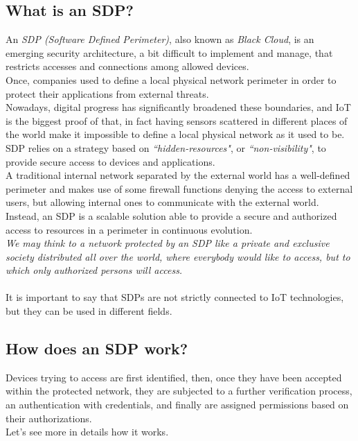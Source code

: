 \documentclass[12pt]{report}
\begin{document}
{{\subsection{What is an SDP?}
\bigskip
An \emph{SDP (Software Defined Perimeter)}, also known as \emph{Black Cloud}, is an emerging security architecture, a bit difficult to implement and manage, that restricts accesses and connections among allowed devices.\\
Once, companies used to define a local physical network perimeter in order to protect their applications from external threats.\\
Nowadays, digital progress has significantly broadened these boundaries, and IoT is the biggest proof of that, in fact having sensors scattered in different places of the world make it impossible to define a local physical network as it used to be.\\

SDP relies on a strategy based on \emph{``hidden-resources"}, or \emph{``non-visibility"}, to provide secure access to devices and applications.\\
A traditional internal network separated by the external world has a well-defined perimeter and makes use of some firewall functions denying the access to external users, but allowing internal ones to communicate with the external world.\\
Instead, an SDP is a scalable solution able to provide a secure and authorized access to resources in a perimeter in continuous evolution.\\

\emph{We may think to a network protected by an SDP like a private and exclusive society distributed all over the world, where everybody would like to access, but to which only authorized persons will access.}~\cite{protectnetwithsdp}\\\\
It is important to say that SDPs are not strictly connected to IoT technologies, but they can be used in different fields.\\

\subsection{How does an SDP work?}
\bigskip

Devices trying to access are first identified, then, once they have been accepted within the protected network, they are subjected to a further verification process, an authentication with credentials, and finally are assigned permissions based on their authorizations.\\
Let's see more in details how it works.\\

}}
\end{document}
